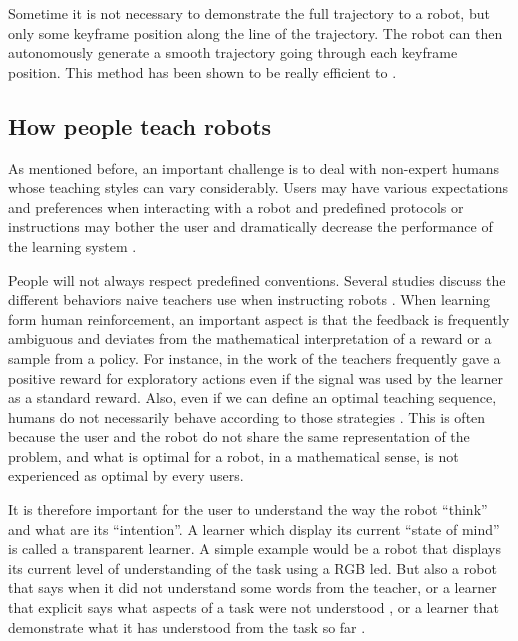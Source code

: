 Sometime it is not necessary to demonstrate the full trajectory to a robot, but only some keyframe position along the line of the trajectory. The robot can then autonomously generate a smooth trajectory going through each keyframe position. This method has been shown to be really efficient to  \cite{akgun12hri}. 

\subsection{How people teach robots}

As mentioned before, an important challenge is to deal with non-expert humans whose teaching styles can vary considerably. Users may have various expectations and preferences when interacting with a robot and predefined protocols or instructions may bother the user and dramatically decrease the performance of the learning system \cite{thomaz2008teachable,rouanet2013impact}.

People will not always respect predefined conventions. Several studies discuss the different behaviors naive teachers use when instructing robots \cite{thomaz2008teachable,Cakmak2010optimality}. When learning form human reinforcement, an important aspect is that the feedback is frequently ambiguous and deviates from the mathematical interpretation of a reward or a sample from a policy. For instance, in the work of \cite{thomaz2008teachable} the teachers frequently gave a positive reward for exploratory actions even if the signal was used by the learner as a standard reward. Also, even if we can define an optimal teaching sequence, humans do not necessarily behave according to those strategies \cite{Cakmak2010optimality}. This is often because the user and the robot do not share the same representation of the problem, and what is optimal for a robot, in a mathematical sense, is not experienced as optimal by every users. 

It is therefore important for the user to understand the way the robot ``think'' and what are its ``intention''. A learner which display its current ``state of mind'' is called a transparent learner. A simple example would be a robot that displays its current level of understanding of the task using a RGB led. But also a robot that says when it did not understand some words from the teacher, or a learner that explicit says what aspects of a task were not understood \cite{chao2010transparent}, or a learner that demonstrate what it has understood from the task so far \cite{cakmak2012designing}. 


